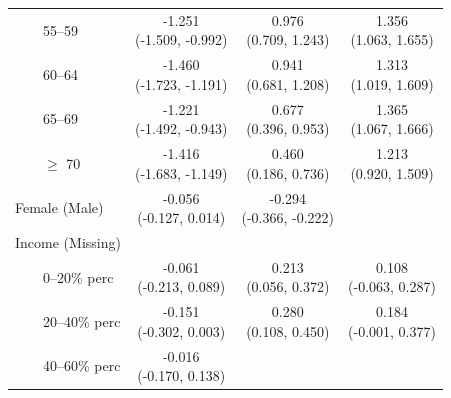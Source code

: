 \documentclass[12pt]{article}
\begin{document}
\begin{appendices}
\begin{longtable}{lccc}
    ~~~~55--59 & \makecell{ -1.251 \\ [-1ex] (-1.509, -0.992) }
               & \makecell{ 0.976 \\ [-1ex] (0.709, 1.243) }
               & \makecell{ 1.356 \\ [-1ex] (1.063, 1.655) } \\ 
    ~~~~60--64 & \makecell{ -1.460 \\ [-1ex] (-1.723, -1.191) }
               & \makecell{ 0.941 \\ [-1ex] (0.681, 1.208) }
               & \makecell{ 1.313 \\ [-1ex] (1.019, 1.609) } \\ 
    ~~~~65--69 & \makecell{ -1.221 \\ [-1ex] (-1.492, -0.943) }
               & \makecell{ 0.677 \\ [-1ex] (0.396, 0.953) }
               & \makecell{ 1.365 \\ [-1ex] (1.067, 1.666) } \\ 
    ~~~~$\geq$ 70 & \makecell{ -1.416 \\ [-1ex] (-1.683, -1.149) }
                  & \makecell{ 0.460 \\ [-1ex] (0.186, 0.736) }
                  & \makecell{ 1.213 \\ [-1ex] (0.920, 1.509) } \\ 
    Female (Male) & \makecell{ -0.056 \\ [-1ex] (-0.127, 0.014) }
                  & \makecell{ -0.294 \\ [-1ex] (-0.366, -0.222) }
                  &  \\ 
    Income (Missing) & & & \\
    ~~~~0--20\% perc & \makecell{ -0.061 \\ [-1ex] (-0.213, 0.089) }
                     & \makecell{ 0.213 \\ [-1ex] (0.056, 0.372) }
                     & \makecell{ 0.108 \\ [-1ex] (-0.063, 0.287) } \\
    ~~~~20--40\% perc & \makecell{ -0.151 \\ [-1ex] (-0.302, 0.003) }
                      & \makecell{ 0.280 \\ [-1ex] (0.108, 0.450) }
                      & \makecell{ 0.184 \\ [-1ex] (-0.001, 0.377) } \\ 
    ~~~~40--60\% perc & \makecell{ -0.016 \\ [-1ex] (-0.170, 0.138) }

\end{longtable}
\end{appendices}
\end{document}
